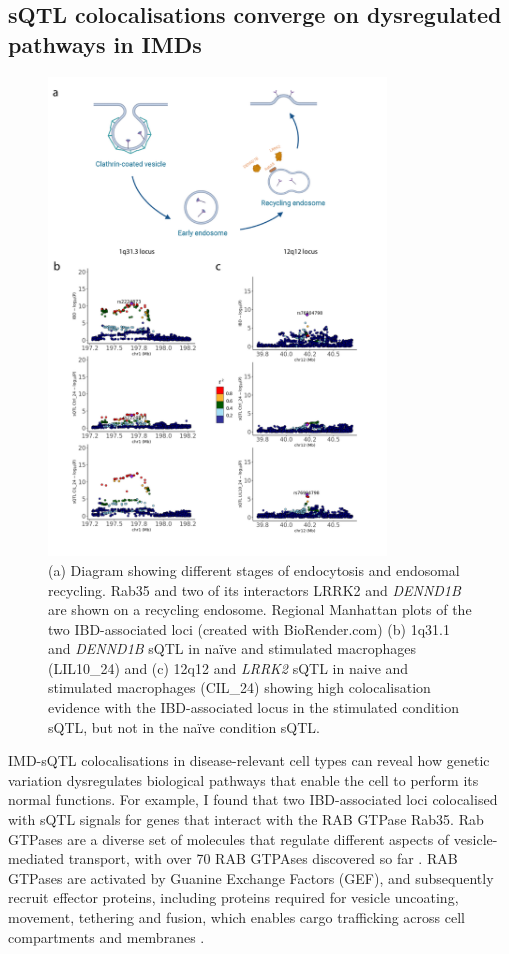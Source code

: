 \subsection{sQTL colocalisations converge on dysregulated pathways in IMDs}
\begin{figure}
  \centering
  \includegraphics[width=0.8\textwidth]{dennd1b}
  \caption[Colocalisation of \textit{DENND1B} and \textit{LRRK2} sQTLs with IBD-associated loci]{(a) Diagram showing different stages of endocytosis and endosomal recycling. Rab35 and two of its interactors LRRK2 and \textit{DENND1B} are shown on a recycling endosome. Regional Manhattan plots of the two IBD-associated loci (created with BioRender.com) (b) 1q31.1 and \textit{DENND1B} sQTL in naïve and stimulated macrophages (LIL10\_24) and (c) 12q12 and \textit{LRRK2} sQTL in naive and stimulated macrophages (CIL\_24) showing high colocalisation evidence with the IBD-associated locus in the stimulated condition sQTL, but not in the naïve condition sQTL.}
  \label{fig:dennd1b}   
\end{figure}
IMD-sQTL colocalisations in disease-relevant cell types can reveal how genetic variation dysregulates biological pathways that enable the cell to perform its normal functions.
For example, I found that two IBD-associated loci colocalised with sQTL signals for genes that interact with the RAB GTPase Rab35. Rab GTPases are a diverse set of molecules that regulate different aspects of vesicle-mediated transport, with over 70 RAB GTPAses discovered so far \cite{Sigismund2021-cu}. RAB GTPases are activated by Guanine Exchange Factors (GEF), and subsequently recruit effector proteins, including proteins required for vesicle uncoating, movement, tethering and fusion, which enables cargo trafficking across cell compartments and membranes \cite{Yoneyama2005-ba}.\\

